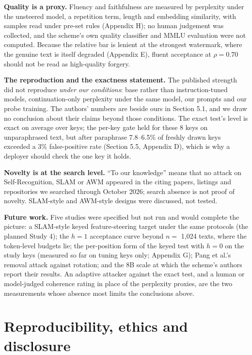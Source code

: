 \documentclass[11pt,letterpaper]{article}
\begin{document}
\textbf{Quality is a proxy.} Fluency and faithfulness are measured by perplexity under the unsteered model, a repetition term, length and embedding similarity, with samples read under pre-set rules (Appendix H); no human judgement was collected, and the scheme's own quality classifier and MMLU evaluation were not computed. Because the relative bar is lenient at the strongest watermark, where the genuine text is itself degraded (Appendix E), fluent acceptance at \(\rho = 0.70\) should not be read as high-quality forgery.

\textbf{The reproduction and the exactness statement.} The published strength did not reproduce \emph{under our conditions}: base rather than instruction-tuned models, continuation-only perplexity under the same model, our prompts and our probe training. The authors' numbers are beside ours in Section 5.1, and we draw no conclusion about their claims beyond those conditions. The exact test's level is exact on average over keys; the per-key gate held for these 8 keys on unparaphrased text, but after paraphrase 7.8--6.5\% of freshly drawn keys exceeded a 3\% false-positive rate (Section 5.5, Appendix D), which is why a deployer should check the one key it holds.

\textbf{Novelty is at the search level.} ``To our knowledge'' means that no attack on Self-Recognition, SLAM or AWM appeared in the citing papers, listings and repositories we searched through October 2026; search absence is not proof of novelty. SLAM-style and AWM-style designs were discussed, not tested.

\textbf{Future work.} Five studies were specified but not run and would complete the picture: a SLAM-style keyed feature-steering target under the same protocols (the planned Study 4); the \(h = 1\) acceptance curve beyond \(n =\) 1,024 texts, where the token-level budgets lie; the per-position form of the keyed test with \(h = 0\) on the study keys (measured so far on tuning keys only; Appendix G); Pang et al.'s removal attack against rotation; and the 8B scale at which the scheme's authors report their results. An adaptive attacker against the exact test, and a human or model-judged coherence rating in place of the perplexity proxies, are the two measurements whose absence most limits the conclusions above.

\hypertarget{reproducibility-ethics-and-disclosure}{%
\section{Reproducibility, ethics and disclosure}\label{reproducibility-ethics-and-disclosure}}
\end{document}
